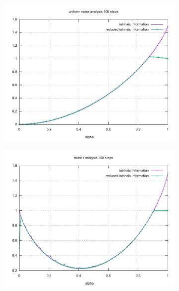 \begin{figure}[h!]
		\begin{subfigure}{0.5\textwidth}
			\includegraphics[scale=0.3]{images/graphs/uniform_FourPDstr_100.pdf}
		\end{subfigure}
		\begin{subfigure}{0.5\textwidth}
			\includegraphics[scale=0.3]{images/graphs/noise1_FourPDstr_100.pdf}
		\end{subfigure}\\[1ex]
		\begin{subfigure}{\linewidth}

\end{subfigure}
\end{figure}
